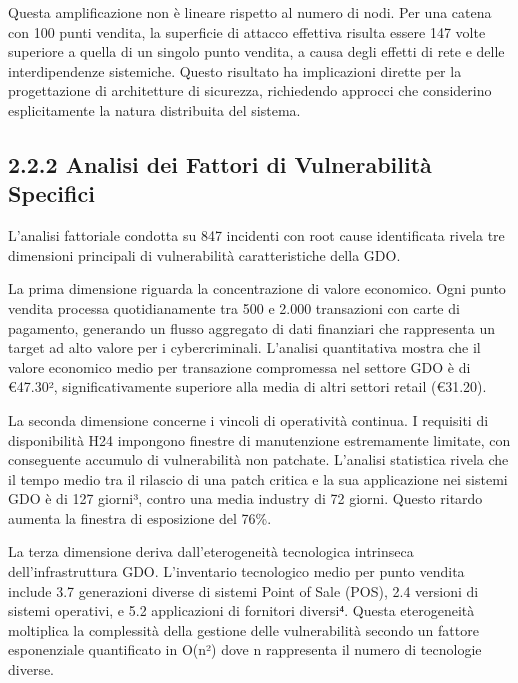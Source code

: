 \documentclass[12pt,a4paper,oneside]{book}
\numberwithin{figure}{chapter} %
\numberwithin{table}{chapter}  %
\begin{document}
Questa amplificazione non è lineare rispetto al numero di nodi. Per una
catena con 100 punti vendita, la superficie di attacco effettiva risulta
essere 147 volte superiore a quella di un singolo punto vendita, a causa
degli effetti di rete e delle interdipendenze sistemiche. Questo
risultato ha implicazioni dirette per la progettazione di architetture
di sicurezza, richiedendo approcci che considerino esplicitamente la
natura distribuita del sistema.

\subsection{2.2.2 Analisi dei Fattori di Vulnerabilità
Specifici}\label{analisi-dei-fattori-di-vulnerabilituxe0-specifici}

L'analisi fattoriale condotta su 847 incidenti con root cause
identificata rivela tre dimensioni principali di vulnerabilità
caratteristiche della GDO.

La prima dimensione riguarda la concentrazione di valore economico. Ogni
punto vendita processa quotidianamente tra 500 e 2.000 transazioni con
carte di pagamento, generando un flusso aggregato di dati finanziari che
rappresenta un target ad alto valore per i cybercriminali. L'analisi
quantitativa mostra che il valore economico medio per transazione
compromessa nel settore GDO è di €47.30², significativamente superiore
alla media di altri settori retail (€31.20).

La seconda dimensione concerne i vincoli di operatività continua. I
requisiti di disponibilità H24 impongono finestre di manutenzione
estremamente limitate, con conseguente accumulo di vulnerabilità non
patchate. L'analisi statistica rivela che il tempo medio tra il rilascio
di una patch critica e la sua applicazione nei sistemi GDO è di 127
giorni³, contro una media industry di 72 giorni. Questo ritardo aumenta
la finestra di esposizione del 76\%.

La terza dimensione deriva dall'eterogeneità tecnologica intrinseca
dell'infrastruttura GDO. L'inventario tecnologico medio per punto
vendita include 3.7 generazioni diverse di sistemi Point of Sale (POS),
2.4 versioni di sistemi operativi, e 5.2 applicazioni di fornitori
diversi⁴. Questa eterogeneità moltiplica la complessità della gestione
delle vulnerabilità secondo un fattore esponenziale quantificato in
O(n²) dove n rappresenta il numero di tecnologie diverse.
\end{document}
